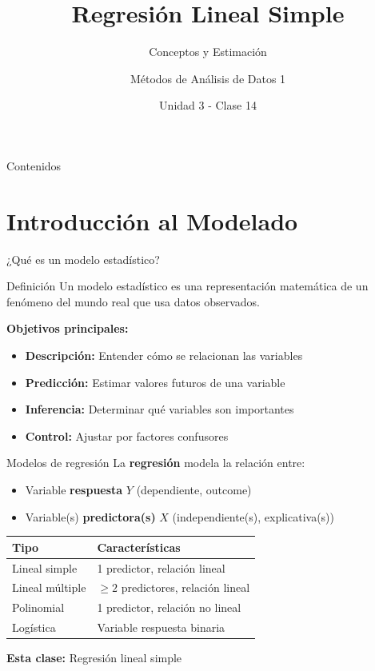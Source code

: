 \documentclass[aspectratio=169]{beamer}
\title{Regresión Lineal Simple}
\subtitle{Conceptos y Estimación}
\author{Métodos de Análisis de Datos 1}
\institute{Universidad Nacional del Sur}
\date{Unidad 3 - Clase 14}
\begin{document}
\frame{\titlepage}

\begin{frame}{Contenidos}
\tableofcontents
\end{frame}

\section{Introducción al Modelado}

\begin{frame}{¿Qué es un modelo estadístico?}
\begin{block}{Definición}
Un modelo estadístico es una representación matemática de un fenómeno del mundo real que usa datos observados.
\end{block}

\vspace{0.5cm}
\textbf{Objetivos principales:}
\begin{itemize}
    \item \textbf{Descripción:} Entender cómo se relacionan las variables
    \item \textbf{Predicción:} Estimar valores futuros de una variable
    \item \textbf{Inferencia:} Determinar qué variables son importantes
    \item \textbf{Control:} Ajustar por factores confusores
\end{itemize}
\end{frame}

\begin{frame}{Modelos de regresión}
La \textbf{regresión} modela la relación entre:
\begin{itemize}
    \item Variable \textbf{respuesta} $Y$ (dependiente, outcome)
    \item Variable(s) \textbf{predictora(s)} $X$ (independiente(s), explicativa(s))
\end{itemize}

\vspace{0.5cm}
\begin{table}
\centering
\begin{tabular}{ll}
\toprule
\textbf{Tipo} & \textbf{Características} \\
\midrule
Lineal simple & 1 predictor, relación lineal \\
Lineal múltiple & $\geq 2$ predictores, relación lineal \\
Polinomial & 1 predictor, relación no lineal \\
Logística & Variable respuesta binaria \\
\bottomrule
\end{tabular}
\end{table}

\vspace{0.3cm}
\textbf{Esta clase:} Regresión lineal simple
\end{frame}
\end{document}
